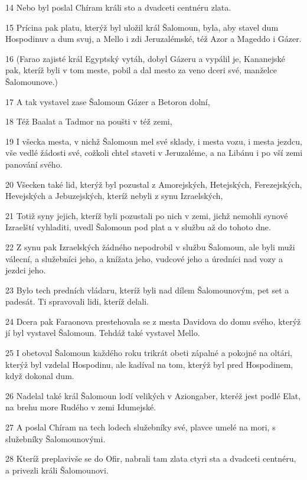 \par 14 Nebo byl poslal Chíram králi sto a dvadceti centnéru zlata.
\par 15 Prícina pak platu, kterýž byl uložil král Šalomoun, byla, aby stavel dum Hospodinuv a dum svuj, a Mello i zdi Jeruzalémské, též Azor a Mageddo i Gázer.
\par 16 (Farao zajisté král Egyptský vytáh, dobyl Gázeru a vypálil je, Kananejské pak, kteríž byli v tom meste, pobil a dal mesto za veno dceri své, manželce Šalomounove.)
\par 17 A tak vystavel zase Šalomoun Gázer a Betoron dolní,
\par 18 Též Baalat a Tadmor na poušti v též zemi,
\par 19 I všecka mesta, v nichž Šalomoun mel své sklady, i mesta vozu, i mesta jezdcu, vše vedlé žádosti své, cožkoli chtel staveti v Jeruzaléme, a na Libánu i po vší zemi panování svého.
\par 20 Všecken také lid, kterýž byl pozustal z Amorejských, Hetejských, Ferezejských, Hevejských a Jebuzejských, kteríž nebyli z synu Izraelských,
\par 21 Totiž syny jejich, kteríž byli pozustali po nich v zemi, jichž nemohli synové Izraelští vyhladiti, uvedl Šalomoun pod plat a v službu až do tohoto dne.
\par 22 Z synu pak Izraelských žádného nepodrobil v službu Šalomoun, ale byli muži válecní, a služebníci jeho, a knížata jeho, vudcové jeho a úredníci nad vozy a jezdci jeho.
\par 23 Bylo tech predních vládaru, kteríž byli nad dílem Šalomounovým, pet set a padesát. Ti spravovali lidi, kteríž delali.
\par 24 Dcera pak Faraonova prestehovala se z mesta Davidova do domu svého, kterýž jí byl vystavel Šalomoun. Tehdáž také vystavel Mello.
\par 25 I obetoval Šalomoun každého roku trikrát obeti zápalné a pokojné na oltári, kterýž byl vzdelal Hospodinu, ale kadíval na tom, kterýž byl pred Hospodinem, když dokonal dum.
\par 26 Nadelal také král Šalomoun lodí velikých v Aziongaber, kteréž jest podlé Elat, na brehu more Rudého v zemi Idumejské.
\par 27 A poslal Chíram na tech lodech služebníky své, plavce umelé na mori, s služebníky Šalomounovými.
\par 28 Kteríž preplavivše se do Ofir, nabrali tam zlata ctyri sta a dvadceti centnéru, a privezli králi Šalomounovi.

